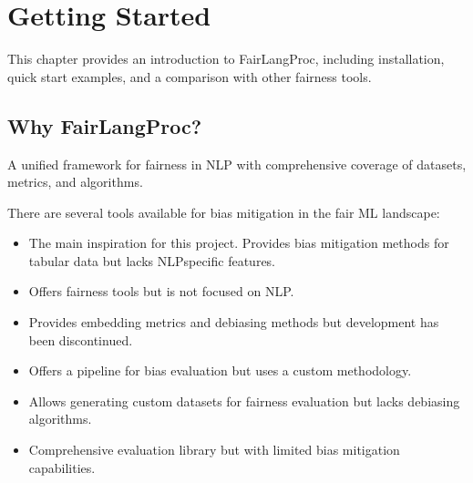 \documentclass[letterpaper,10pt,english]{sphinxmanual}
\begin{document}
\sphinxstepscope


\chapter{Getting Started}
\label{\detokenize{getting_started:getting-started}}\label{\detokenize{getting_started::doc}}
\sphinxAtStartPar
This chapter provides an introduction to FairLangProc, including installation,
quick start examples, and a comparison with other fairness tools.


\section{Why FairLangProc?}
\label{\detokenize{getting_started:why-fairlangproc}}
\sphinxAtStartPar
A unified framework for fairness in NLP with comprehensive coverage of datasets, metrics, and algorithms.

\sphinxAtStartPar
There are several tools available for bias mitigation in the fair ML landscape:
\begin{itemize}
\item {} 
\sphinxAtStartPar
{} \sphinxhyphen{} The main inspiration for this project. Provides bias mitigation methods for tabular data but lacks NLP\sphinxhyphen{}specific features.

\item {} 
\sphinxAtStartPar
{} \sphinxhyphen{} Offers fairness tools but is not focused on NLP.

\item {} 
\sphinxAtStartPar
{} \sphinxhyphen{} Provides embedding metrics and debiasing methods but development has been discontinued.

\item {} 
\sphinxAtStartPar
{} \sphinxhyphen{} Offers a pipeline for bias evaluation but uses a custom methodology.

\item {} 
\sphinxAtStartPar
{} \sphinxhyphen{} Allows generating custom datasets for fairness evaluation but lacks debiasing algorithms.

\item {} 
\sphinxAtStartPar
{} \sphinxhyphen{} Comprehensive evaluation library but with limited bias mitigation capabilities.

\end{itemize}
\end{document}
